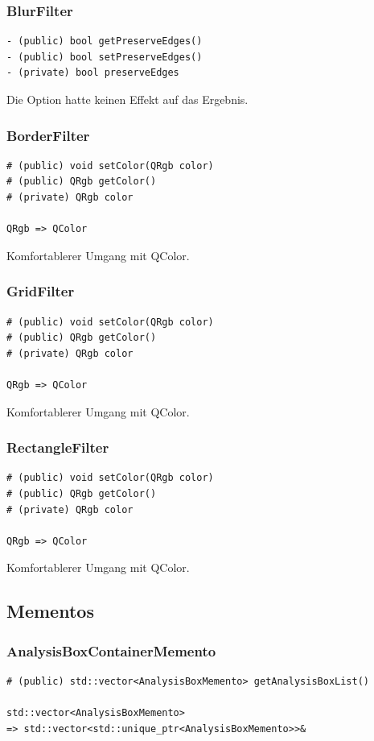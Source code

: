 \documentclass{scrartcl}
\begin{document}
{\subsubsection{BlurFilter}
\bigskip
\begin{verbatim}
- (public) bool getPreserveEdges()
- (public) bool setPreserveEdges()
- (private) bool preserveEdges
\end{verbatim}
Die Option hatte keinen Effekt auf das Ergebnis.
\bigskip
\subsubsection{BorderFilter}
\bigskip
\begin{verbatim}
# (public) void setColor(QRgb color)
# (public) QRgb getColor()
# (private) QRgb color

QRgb => QColor
\end{verbatim}
Komfortablerer Umgang mit QColor.
\bigskip
\subsubsection{GridFilter}
\bigskip
\begin{verbatim}
# (public) void setColor(QRgb color)
# (public) QRgb getColor()
# (private) QRgb color

QRgb => QColor
\end{verbatim}
Komfortablerer Umgang mit QColor.
\bigskip
\subsubsection{RectangleFilter}
\bigskip
\begin{verbatim}
# (public) void setColor(QRgb color)
# (public) QRgb getColor()
# (private) QRgb color

QRgb => QColor
\end{verbatim}
Komfortablerer Umgang mit QColor.
\newpage
\subsection{Mementos}
\subsubsection{AnalysisBoxContainerMemento}
\bigskip
\begin{verbatim}
# (public) std::vector<AnalysisBoxMemento> getAnalysisBoxList()

std::vector<AnalysisBoxMemento> 
=> std::vector<std::unique_ptr<AnalysisBoxMemento>>&


\end{verbatim}}
\end{document}
